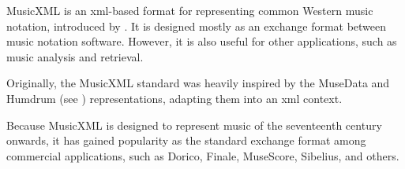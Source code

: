 


MusicXML is an \gls{xml}-based format for representing
common Western music notation, introduced by
\textcite{good2001musicxml}. It is designed mostly as an
exchange format between music notation software. However, it
is also useful for other applications, such as music
analysis and retrieval.

Originally, the MusicXML standard was heavily inspired by
the MuseData and Humdrum (see
) representations, adapting
them into an \gls{xml} context.



Because MusicXML is designed to represent music of the
seventeenth century onwards, it has gained popularity as the
standard exchange format among commercial applications, such
as Dorico,
Finale,
MuseScore,
Sibelius, and
others.


